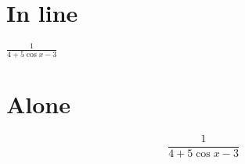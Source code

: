\documentclass[10pt,a4paper]{article}
\begin{document}
\section{In line}

$\frac{1}{4+5 \cos x - 3}$

\section{Alone}

\[ \frac{1}{4+5 \cos x - 3} \]
\end{document}
